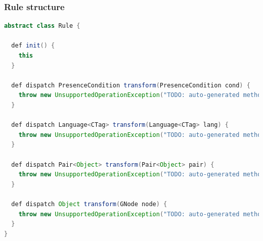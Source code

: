 \documentclass{beamer}
\begin{document}
\begin{frame}[fragile]
\frametitle{Rule structure}

\begin{lstlisting}[language=java]
abstract class Rule {

  def init() {
    this
  }

  def dispatch PresenceCondition transform(PresenceCondition cond) {
    throw new UnsupportedOperationException("TODO: auto-generated method stub")
  }

  def dispatch Language<CTag> transform(Language<CTag> lang) {
    throw new UnsupportedOperationException("TODO: auto-generated method stub")
  }

  def dispatch Pair<Object> transform(Pair<Object> pair) {
    throw new UnsupportedOperationException("TODO: auto-generated method stub")
  }

  def dispatch Object transform(GNode node) {
    throw new UnsupportedOperationException("TODO: auto-generated method stub")
  }	
}
\end{lstlisting}

\end{frame}
\end{document}
